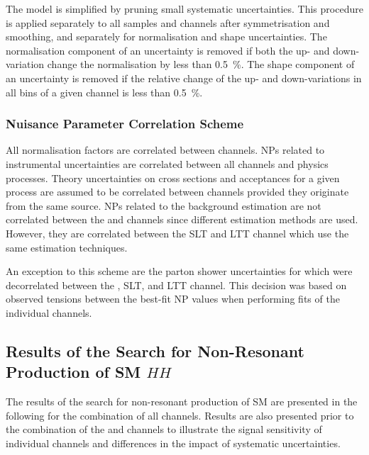 The model is simplified by pruning small systematic uncertainties. This
procedure is applied separately to all samples and channels after symmetrisation
and smoothing, and separately for normalisation and shape uncertainties. The
normalisation component of an uncertainty is removed if both the up- and
down-variation change the normalisation by less than \SI{0.5}{\percent}. The
shape component of an uncertainty is removed if the relative change of the up-
and down-variations in all bins of a given channel is less than
\SI{0.5}{\percent}.


\subsubsection{Nuisance Parameter Correlation Scheme}

All normalisation factors are correlated between channels. NPs related to
instrumental uncertainties are correlated between all channels and physics
processes. Theory uncertainties on cross sections and acceptances for a given
process are assumed to be correlated between channels provided they originate
from the same source. NPs related to the \faketauhadvis background estimation
are not correlated between the \hadhad and \lephad channels since different
estimation methods are used. However, they are correlated between the \lephad
SLT and LTT channel which use the same estimation techniques.

An exception to this scheme are the parton shower uncertainties for \ttbar which
were decorrelated between the \hadhad, \lephad SLT, and \lephad LTT
channel. This decision was based on observed tensions between the best-fit NP
values when performing fits of the individual channels.



\subsection{Results of the Search for Non-Resonant Production of SM $HH$}
\label{sec:results_nonres}

The results of the search for non-resonant production of SM \HH are presented in
the following for the combination of all channels. Results are also presented
prior to the combination of the \hadhad and \lephad channels to illustrate the
signal sensitivity of individual channels and differences in the impact of
systematic uncertainties.

